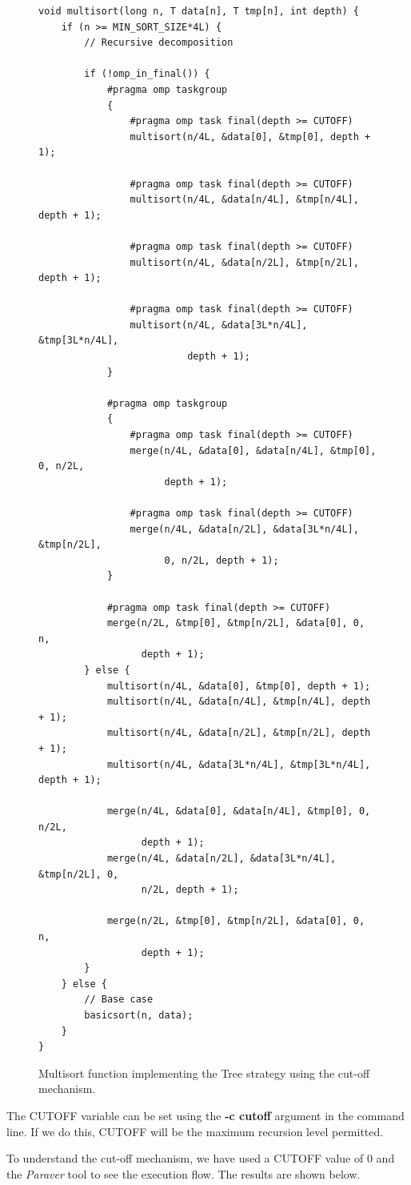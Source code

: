 \documentclass[12pt, a4paper]{article}
\begin{document}
\begin{figure}[H]
\begin{lstlisting}
void multisort(long n, T data[n], T tmp[n], int depth) {
    if (n >= MIN_SORT_SIZE*4L) {
        // Recursive decomposition
        
        if (!omp_in_final()) {
			#pragma omp taskgroup
			{
				#pragma omp task final(depth >= CUTOFF)
				multisort(n/4L, &data[0], &tmp[0], depth + 1);
				
				#pragma omp task final(depth >= CUTOFF)
				multisort(n/4L, &data[n/4L], &tmp[n/4L], depth + 1);
				
				#pragma omp task final(depth >= CUTOFF)
				multisort(n/4L, &data[n/2L], &tmp[n/2L], depth + 1);
				
				#pragma omp task final(depth >= CUTOFF)
				multisort(n/4L, &data[3L*n/4L], &tmp[3L*n/4L],
						  depth + 1);
			}

			#pragma omp taskgroup
			{
				#pragma omp task final(depth >= CUTOFF)
				merge(n/4L, &data[0], &data[n/4L], &tmp[0], 0, n/2L,
					  depth + 1);
				
				#pragma omp task final(depth >= CUTOFF)
				merge(n/4L, &data[n/2L], &data[3L*n/4L], &tmp[n/2L],
					  0, n/2L, depth + 1);
			}
			
			#pragma omp task final(depth >= CUTOFF)
			merge(n/2L, &tmp[0], &tmp[n/2L], &data[0], 0, n, 
				  depth + 1);
		} else {
			multisort(n/4L, &data[0], &tmp[0], depth + 1);
			multisort(n/4L, &data[n/4L], &tmp[n/4L], depth + 1);
			multisort(n/4L, &data[n/2L], &tmp[n/2L], depth + 1);
			multisort(n/4L, &data[3L*n/4L], &tmp[3L*n/4L], depth + 1);

			merge(n/4L, &data[0], &data[n/4L], &tmp[0], 0, n/2L,
				  depth + 1);
			merge(n/4L, &data[n/2L], &data[3L*n/4L], &tmp[n/2L], 0,
				  n/2L, depth + 1);
			
			merge(n/2L, &tmp[0], &tmp[n/2L], &data[0], 0, n, 
				  depth + 1);
		}
	} else {
		// Base case
		basicsort(n, data);
	}
}
\end{lstlisting}

\caption{Multisort function implementing the Tree strategy using the cut-off mechanism.}
\end{figure}

The CUTOFF variable can be set using the \textbf{-c cutoff} argument in the command line. If we do this, CUTOFF will be the maximum recursion level permitted.

To understand the cut-off mechanism, we have used a CUTOFF value of 0 and the \textit{Paraver} tool to see the execution flow. The results are shown below.
\end{document}
